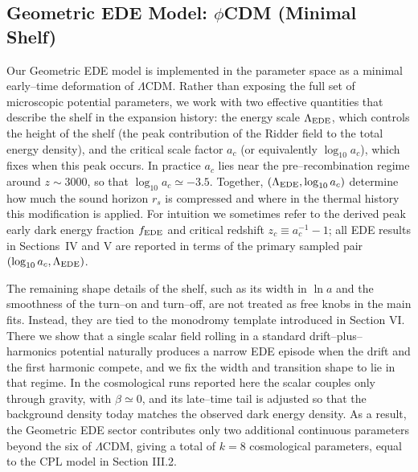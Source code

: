 \documentclass[a4paper,11pt]{article}
\begin{document}
\subsection{Geometric EDE Model: $\phi$CDM (Minimal Shelf)}
\label{sec:ede}

Our Geometric EDE model is implemented in the parameter space as a minimal early--time deformation of $\Lambda$CDM. Rather than exposing the full set of microscopic potential parameters, we work with two effective quantities that describe the shelf in the expansion history: the energy scale $\Lambda_{\rm EDE}$, which controls the height of the shelf (the peak contribution of the Ridder field to the total energy density), and the critical scale factor $a_c$ (or equivalently $\log_{10}a_c$), which fixes when this peak occurs. In practice $a_c$ lies near the pre--recombination regime around $z \sim 3000$, so that $\log_{10}a_c \simeq -3.5$. Together, $(\Lambda_{\rm EDE}, \log_{10}a_c)$ determine how much the sound horizon $r_s$ is compressed and where in the thermal history this modification is applied. For intuition we sometimes refer to the derived peak early dark energy fraction $f_{\rm EDE}$ and critical redshift $z_c \equiv a_c^{-1} - 1$; all EDE results in Sections~IV and V are reported in terms of the primary sampled pair $(\log_{10}a_c, \Lambda_{\rm EDE})$.

The remaining shape details of the shelf, such as its width in $\ln a$ and the smoothness of the turn--on and turn--off, are not treated as free knobs in the main fits. Instead, they are tied to the monodromy template introduced in Section VI. There we show that a single scalar field rolling in a standard drift--plus--harmonics potential naturally produces a narrow EDE episode when the drift and the first harmonic compete, and we fix the width and transition shape to lie in that regime. In the cosmological runs reported here the scalar couples only through gravity, with $\beta \simeq 0$, and its late--time tail is adjusted so that the background density today matches the observed dark energy density. As a result, the Geometric EDE sector contributes only two additional continuous parameters beyond the six of $\Lambda$CDM, giving a total of $k = 8$ cosmological parameters, equal to the CPL model in Section III.2.
\end{document}

